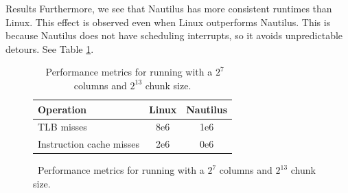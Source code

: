\begin{block}{Results}
  Furthermore, we see that Nautilus has more consistent runtimes than Linux. This effect is observed even when Linux outperforms Nautilus. This is because Nautilus does not have scheduling interrupts, so it avoids unpredictable detours. See Table \ref{table:cache_miss}.

  \begin{figure}
    \begin{table}
      \begin{tabular}{l || c | c }
        Operation  & Linux & Nautilus \\
        \hline\hline
        TLB misses               & 8e6 & 1e6 \\
        Instruction cache misses & 2e6 & 0e6  \\

      \end{tabular}
      \label{table:cache_miss}
      \caption{~Performance metrics for running with a $2^7$ columns and $2^13$ chunk size.}
    \end{table}
  \end{figure}
\end{block}

